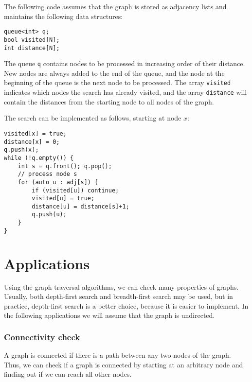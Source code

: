 The following code assumes that the graph is stored
as adjacency lists and maintains the following
data structures:
\begin{lstlisting}
queue<int> q;
bool visited[N];
int distance[N];
\end{lstlisting}

The queue \texttt{q}
contains nodes to be processed
in increasing order of their distance.
New nodes are always added to the end
of the queue, and the node at the beginning
of the queue is the next node to be processed.
The array \texttt{visited} indicates
which nodes the search has already visited,
and the array \texttt{distance} will contain the
distances from the starting node to all nodes of the graph.

The search can be implemented as follows,
starting at node $x$:
\begin{lstlisting}
visited[x] = true;
distance[x] = 0;
q.push(x);
while (!q.empty()) {
    int s = q.front(); q.pop();
    // process node s
    for (auto u : adj[s]) {
        if (visited[u]) continue;
        visited[u] = true;
        distance[u] = distance[s]+1;
        q.push(u);
    }
}
\end{lstlisting}

\section{Applications}

Using the graph traversal algorithms,
we can check many properties of graphs.
Usually, both depth-first search and
breadth-first search may be used,
but in practice, depth-first search
is a better choice, because it is
easier to implement.
In the following applications we will
assume that the graph is undirected.

\subsubsection{Connectivity check}


A graph is connected if there is a path
between any two nodes of the graph.
Thus, we can check if a graph is connected
by starting at an arbitrary node and
finding out if we can reach all other nodes.

